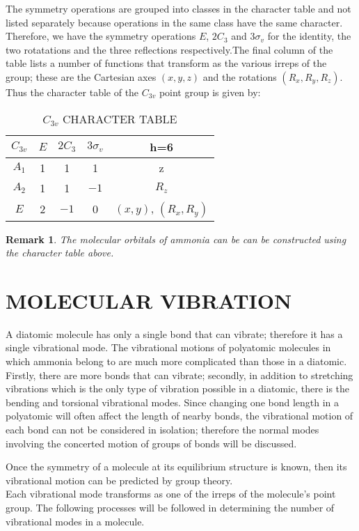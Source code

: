 \documentclass[a4paper, 12pt, openany]{report}
\newtheorem{rmk}{Remark}[section]
\begin{document}
 The symmetry operations are grouped into classes in the character table and not listed separately because operations in the same class have the same character. Therefore, we have the symmetry operations  $E$, $2C_3$ and $3\sigma_v$ for the identity, the two rotatations and the three reflections respectively.The final column of the table lists a number of functions that transform as the various irreps of the
 group; these are the Cartesian axes $(x,y,z)$ and the rotations $(R_x,R_y,R_z)$.
 Thus the character table of the $C_{3v}$ point group is given by:
 
 \begin{table}[H]\centering\caption{ $C_{3v}$ CHARACTER TABLE}\begin{tabular}{|c|ccc|c|}\hline
 		$C_{3v}$&$E$&$2C_3$&$3\sigma_v$&h=6 \\\hline
 		$A_1$&1&1&1&z\\
 		$A_2$&1&1&$-1$&$R_z$\\
 		$E$&2&$-1$&0&$(x,y)$, $(R_x,R_y)$\\\hline
 	\end{tabular}\end{table} 
 \begin{rmk} The molecular orbitals of ammonia can be can be constructed using the character table above.\end{rmk}
 \section{MOLECULAR VIBRATION}
 A diatomic molecule has only a single bond that can vibrate; therefore it has a single vibrational mode. The vibrational motions  of polyatomic molecules in which ammonia belong to are much more complicated than those in a diatomic. Firstly, there are more bonds that can vibrate; secondly, in \break addition to stretching vibrations which is the only type of vibration \break possible in a diatomic, there is the bending and torsional vibrational modes. Since changing one bond length in a polyatomic will often affect the length of nearby bonds, the vibrational motion of each bond can not be considered in isolation; therefore the normal modes involving the concerted motion of groups of bonds will be discussed.
 
 Once the symmetry of a molecule at its equilibrium structure is known, then its vibrational motion can be predicted by group theory.\\Each vibrational mode transforms as one of the irreps of the molecule’s point group. 
 The following processes will be followed in determining the number of vibrational modes in a molecule.
\end{document}

